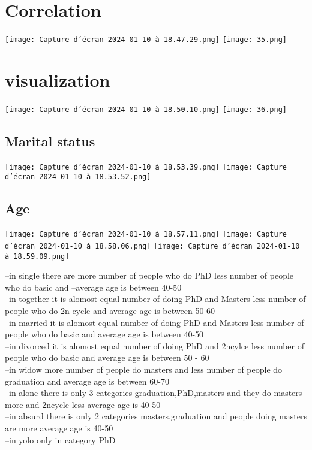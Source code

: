 \documentclass[12pt,a4paper]{report}
\begin{document}
\section{ Correlation }
\begin{center}
    \texttt{[image: Capture d’écran 2024-01-10 à 18.47.29.png]}
    \texttt{[image: 35.png]}
   
\end{center} 
\section{ visualization}
\begin{center}
    \texttt{[image: Capture d’écran 2024-01-10 à 18.50.10.png]}
    \texttt{[image: 36.png]}
   
\end{center} 
\subsection{ Marital status}
\begin{center}
    \texttt{[image: Capture d’écran 2024-01-10 à 18.53.39.png]}
    \texttt{[image: Capture d’écran 2024-01-10 à 18.53.52.png]}
   
\end{center} 
\subsection{ Age}
\begin{center}
    \texttt{[image: Capture d’écran 2024-01-10 à 18.57.11.png]}
    \texttt{[image: Capture d’écran 2024-01-10 à 18.58.06.png]}
    \texttt{[image: Capture d’écran 2024-01-10 à 18.59.09.png]}
\end{center} 
--in single there are more number of people who do PhD less number of people who do basic and --average age is between 40-50\\
--in together it is alomost equal number of doing PhD and Masters less number of people who do 2n cycle and average age is between 50-60\\
--in married it is alomost equal number of doing PhD and Masters less number of people who do basic and average age is between 40-50\\
--in divorced it is alomost equal number of doing PhD and 2ncylce less number of people who do basic and average age is between 50 - 60\\
--in widow more number of people do masters and less number of people do graduation and average age is between 60-70\\
--in alone there is only 3 categories graduation,PhD,masters and they do masters more and 2ncycle less average age is 40-50\\
--in absurd there is only 2 categories masters,graduation and people doing masters are more average age is 40-50\\
--in yolo only in category PhD
\end{document}
